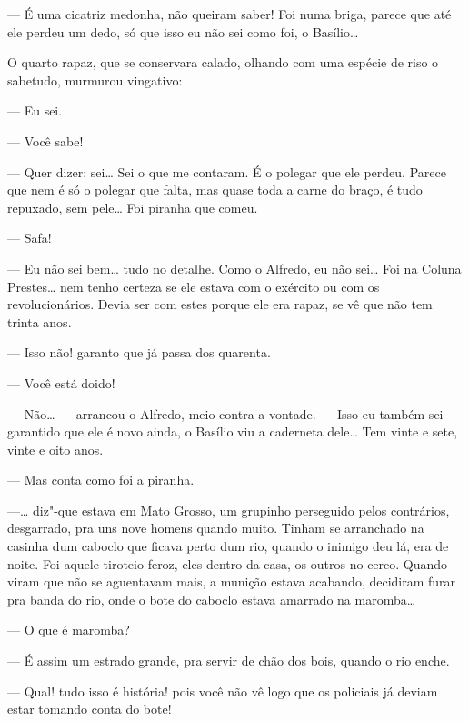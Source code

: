 --- É uma cicatriz medonha, não queiram saber! Foi numa briga, parece
que até ele perdeu um dedo, só que isso eu não sei como foi, o
Basílio\ldots{}

O quarto rapaz, que se conservara calado, olhando com uma espécie de
riso o sabetudo, murmurou vingativo:

--- Eu sei.

--- Você sabe!

--- Quer dizer: sei\ldots{} Sei o que me contaram. É o polegar que ele
perdeu. Parece que nem é só o polegar que falta, mas quase toda a carne
do braço, é tudo repuxado, sem pele\ldots{} Foi piranha que comeu.

--- Safa!

--- Eu não sei bem\ldots{} tudo no detalhe. Como o Alfredo, eu não sei\ldots{} Foi
na Coluna Prestes\ldots{} nem tenho certeza se ele estava com o exército ou
com os revolucionários. Devia ser com estes porque ele era rapaz, se vê
que não tem trinta anos.

--- Isso não! garanto que já passa dos quarenta.

--- Você está doido!

--- Não\ldots{} --- arrancou o Alfredo, meio contra a vontade. --- Isso eu
também sei garantido que ele é novo ainda, o Basílio viu a caderneta
dele\ldots{} Tem vinte e sete, vinte e oito anos.

--- Mas conta como foi a piranha.

---\ldots{} diz"-que estava em Mato Grosso, um grupinho perseguido pelos
contrários, desgarrado, pra uns nove homens quando muito. Tinham se
arranchado na casinha dum caboclo que ficava perto dum rio, quando o
inimigo deu lá, era de noite. Foi aquele tiroteio feroz, eles dentro da
casa, os outros no cerco. Quando viram que não se aguentavam mais, a
munição estava acabando, decidiram furar pra banda do rio, onde o bote
do caboclo estava amarrado na maromba\ldots{}

--- O que é maromba?

--- É assim um estrado grande, pra servir de chão dos bois, quando o rio
enche.

--- Qual! tudo isso é história! pois você não vê logo que os policiais
já deviam estar tomando conta do bote!

